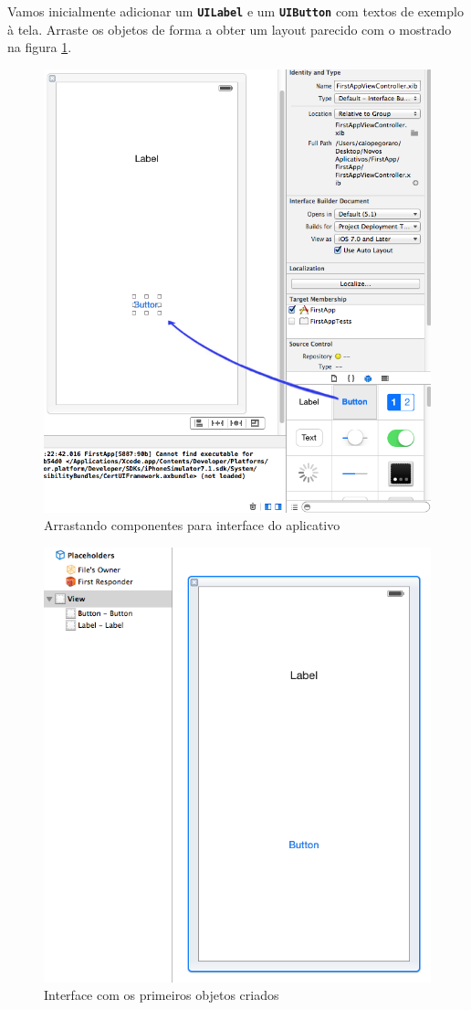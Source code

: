\documentclass[a4paper,12pt,brazil,doubleside]{book}
\begin{document}
\begin{singlespace}
Vamos inicialmente adicionar um \texttt{\textbf{UILabel}} e um \texttt{\textbf{UIButton}} com textos de exemplo à tela. Arraste os objetos de forma a obter um layout parecido com o mostrado na figura \ref{fig:arrastando_itens}.

\begin{figure}[H]
  \centering
  \includegraphics[width=.75\textwidth]{figuras/3/tela_novo_projeto_19.png}
  \caption{Arrastando componentes para interface do aplicativo}
  \label{fig:arrastando_itens}
\end{figure}

\begin{figure}[H]
  \centering
  \includegraphics[width=.75\textwidth]{figuras/3/tela_novo_projeto_16.png}
  \caption{Interface com os primeiros objetos criados}
  \label{fig:a}
\end{figure}


\end{singlespace}
\end{document}
